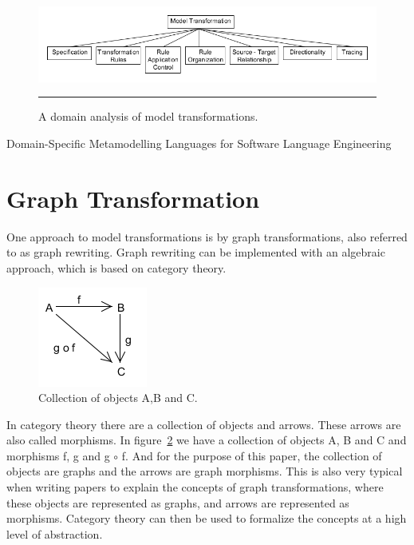 \begin{figure}[H]
  \centering
    \includegraphics[scale=0.5]{./Figures/Model_Transformation_Survey.png}
    \rule{35em}{0.5pt}
  \caption[Domain Analysis of Model Transformations]
  				{A domain analysis of model transformations.}
  \label{fig:Model_Transformation_Survey}
\end{figure}

Domain-Specific Metamodelling Languages for Software Language Engineering

\section{Graph Transformation} 
\noindent One approach to model transformations is by graph transformations,
also referred to as graph rewriting. Graph rewriting can be implemented with
an algebraic approach, which is based on category theory\cite{Barr1990}.

\begin{figure}[H]
	\centering
	\includegraphics[scale=0.7]{./Figures/categoryTheory.png}
	\caption{Collection of objects A,B and C.}
	\label{fig:categoryTheory}
\end{figure}


In category theory there are a collection of objects and arrows. These arrows
are also called morphisms. In figure~\ref{fig:categoryTheory} we have a
collection of objects A, B and C and morphisms f, g and g $\circ$ f. And for the
purpose of this paper, the collection of objects are graphs and the arrows are
graph morphisms. This is also very typical when writing papers to explain the
concepts of graph transformations, where these objects are represented as
graphs, and arrows are represented as morphisms. Category theory can then be
used to formalize the concepts at a high level of abstraction.

